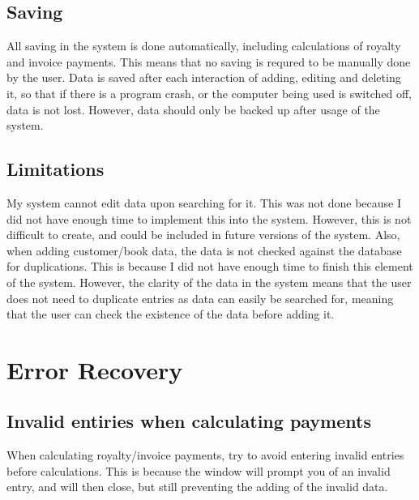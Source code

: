 \subsection{Saving}

All saving in the system is done automatically, including calculations of royalty and invoice payments. This means that no saving is requred to be manually done by the user. Data is saved after each interaction of adding, editing and deleting it, so that if there is a program crash, or the computer being used is switched off, data is not lost. However, data should only be backed up after usage of the system.

\subsection{Limitations}

My system cannot edit data upon searching for it. This was not done because I did not have enough time to implement this into the system. However, this is not difficult to create, and could be included in future versions of the system. Also, when adding customer/book data, the data is not checked against the database for duplications. This is because I did not have enough time to finish this element of the system. However, the clarity of the data in the system means that the user does not need to duplicate entries as data can easily be searched for, meaning that the user can check the existence of the data before adding it.

\section{Error Recovery}

\subsection{Invalid entiries when calculating payments}

When calculating royalty/invoice payments, try to avoid entering invalid entries before calculations. This is because the window will prompt you of an invalid entry, and will then close, but still preventing the adding of the invalid data.

